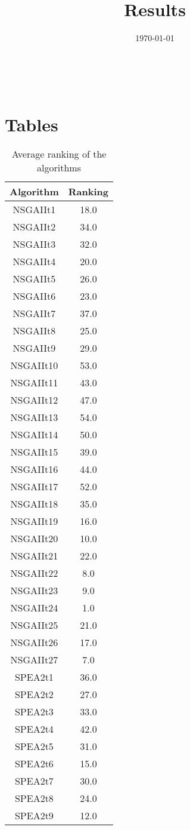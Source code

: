 \documentclass{article}
\title{Results}
\author{}
\date{\today}
\begin{document}
\oddsidemargin 0in \topmargin 0in\maketitle
\
\section{Tables}
\begin{table}[!htp]
\centering
\caption{Average ranking of the algorithms}
\begin{tabular}{c|c}
Algorithm&Ranking\\
\hline
NSGAIIt1&18.0\\
NSGAIIt2&34.0\\
NSGAIIt3&32.0\\
NSGAIIt4&20.0\\
NSGAIIt5&26.0\\
NSGAIIt6&23.0\\
NSGAIIt7&37.0\\
NSGAIIt8&25.0\\
NSGAIIt9&29.0\\
NSGAIIt10&53.0\\
NSGAIIt11&43.0\\
NSGAIIt12&47.0\\
NSGAIIt13&54.0\\
NSGAIIt14&50.0\\
NSGAIIt15&39.0\\
NSGAIIt16&44.0\\
NSGAIIt17&52.0\\
NSGAIIt18&35.0\\
NSGAIIt19&16.0\\
NSGAIIt20&10.0\\
NSGAIIt21&22.0\\
NSGAIIt22&8.0\\
NSGAIIt23&9.0\\
NSGAIIt24&1.0\\
NSGAIIt25&21.0\\
NSGAIIt26&17.0\\
NSGAIIt27&7.0\\
SPEA2t1&36.0\\
SPEA2t2&27.0\\
SPEA2t3&33.0\\
SPEA2t4&42.0\\
SPEA2t5&31.0\\
SPEA2t6&15.0\\
SPEA2t7&30.0\\
SPEA2t8&24.0\\
SPEA2t9&12.0\\

\end{tabular}
\end{table}
\end{document}
